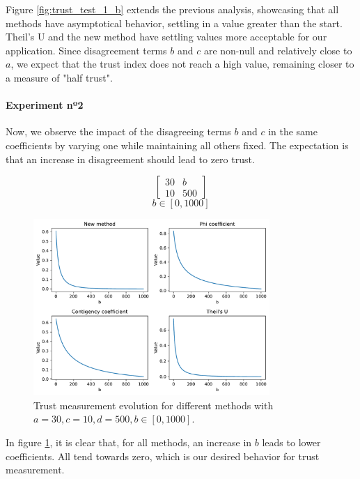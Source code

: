 Figure \ref{fig:trust_test_1_b} extends the previous analysis, showcasing that all methods have asymptotical behavior, settling in a value greater than the start. Theil's U and the new method have settling values more acceptable for our application. Since disagreement terms $b$ and $c$ are non-null and relatively close to $a$, we expect that the trust index does not reach a high value, remaining closer to a measure of "half trust".

\paragraph{Experiment nº2} Now, we observe the impact of the disagreeing terms $b$ and $c$ in the same coefficients by varying one while maintaining all others fixed. The expectation is that an increase in disagreement should lead to zero trust.

$$
\begin{bmatrix}
    30 & b \\ 10 & 500
\end{bmatrix}
$$
$$
b \in [0, 1000]
$$
\begin{figure}[h!]
\centering
    \includegraphics[width=0.8\textwidth]{figures/chapter4/cell/trust_tests/2_a.pdf}
    \caption{Trust measurement evolution for different methods with $a=30, c=10, d=500, b \in [0, 1000]$.}
    \label{fig:trust_test_2_a}
\end{figure}
\FloatBarrier

In figure \ref{fig:trust_test_2_a}, it is clear that, for all methods, an increase in $b$ leads to lower coefficients. All tend towards zero, which is our desired behavior for trust measurement.

